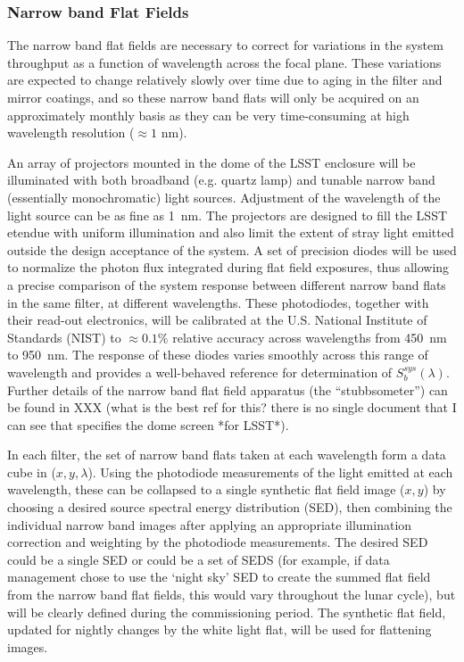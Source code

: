 \documentclass[12pt,preprint]{aastex}
\begin{document}
\subsubsection{Narrow band Flat Fields}
\label{sec:narrowband}

The narrow band flat fields are necessary to correct for variations in
the system throughput as a function of wavelength across the focal
plane. These variations are expected to change relatively slowly over
time due to aging in the filter and mirror coatings, and so these
narrow band flats will only be acquired on an approximately monthly
basis as they can be very time-consuming at high wavelength resolution
($\approx1$ nm).

An array of projectors mounted in the dome of the LSST enclosure will
be illuminated with both broadband (e.g. quartz lamp) and tunable
narrow band (essentially monochromatic) light sources.  Adjustment of
the wavelength of the light source can be as fine as 1~nm. The
projectors are designed to fill the LSST etendue with uniform
illumination and also limit the extent of stray light emitted outside
the design acceptance of the system. A set of precision diodes will be
used to normalize the photon flux integrated during flat field
exposures, thus allowing a precise comparison of the system response
between different narrow band flats in the same filter, at different
wavelengths.  These photodiodes, together with their read-out
electronics, will be calibrated at the U.S. National Institute of
Standards (NIST) to $\approx0.1\%$ relative accuracy across
wavelengths from 450~nm to 950~nm. The response of these diodes varies
smoothly across this range of wavelength and provides a well-behaved
reference for determination of $S_b^{sys}(\lambda)$.  Further details
of the narrow band flat field apparatus (the ``stubbsometer'') can be
found in XXX (what is the best ref for this? there is no single document that I can see that
specifies the dome screen *for LSST*).

In each filter, the set of narrow band flats taken at each wavelength
form a data cube in ($x,y,\lambda$). Using the photodiode measurements
of the light emitted at each wavelength, these can be collapsed to a
single synthetic flat field image ($x,y$) by choosing a desired source
spectral energy distribution (SED), then combining the individual narrow
band images after applying an appropriate illumination correction and
weighting by the photodiode measurements. The desired
SED could be a single SED or could be a set of SEDS (for example, if
data management chose to use the `night sky' SED to create the summed
flat field from the narrow band flat fields, this would vary
throughout the lunar cycle), but will be clearly defined during the
commissioning period. The synthetic flat field, updated for nightly
changes by the white light flat, will be used for flattening images.
\end{document}
